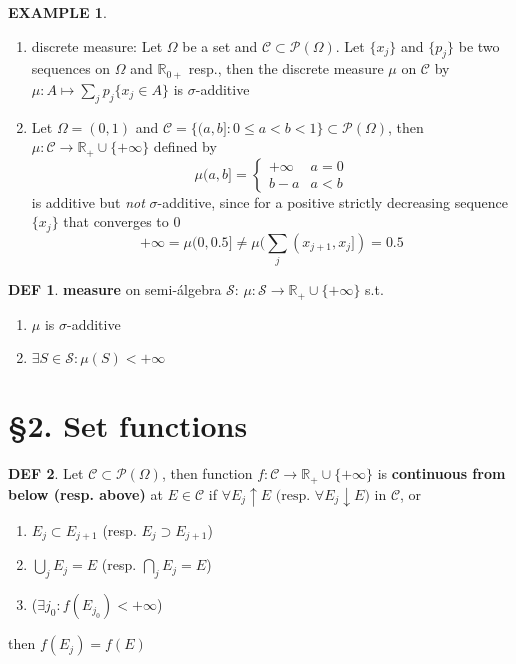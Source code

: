 \documentclass[hidelinks]{article}
\theoremstyle{definition}
\newtheorem*{defin}{DEF}
\newtheorem*{eg}{EXAMPLE}
\theoremstyle{dotless}
\theoremstyle{remark}
\begin{document}
\begin{eg}~
\begin{enumerate}[label=\arabic*\degree]
    \item discrete measure: Let $\Omega$ be a set and $\mathscr{C}\subset\mathscr{P}(\Omega)$. Let $\{x_j\}$ and $\{p_j\}$ be two sequences on $\Omega$ and $\mathbb{R}_{0+}$ resp., then the discrete measure $\mu$ on $\mathscr{C}$ by $\mu:A\mapsto\sum_jp_j\{x_j\in A\}$ is $\sigma$-additive
    \item Let $\Omega=(0,1)$ and $\mathscr{C}=\{(a,b]:0\leq a<b<1\}\subset\mathscr{P}(\Omega)$, then $\mu:\mathscr{C}\to\mathbb{R}_+\cup\{+\infty\}$ defined by
    \[\mu(a,b]=
    \begin{cases} 
      +\infty & a=0 \\
      b-a & a<b
   \end{cases}
\]
is additive but \emph{not} $\sigma$-additive, since for a positive strictly decreasing sequence $\{x_j\}$ that converges to 0
\[+\infty=\mu(0,0.5]\neq\mu(\sum_j(x_{j+1},x_j])=0.5\]
\end{enumerate}
\end{eg}

\begin{defin}
\textbf{measure} on semi-álgebra $\mathscr{S}$: $\mu:\mathscr{S}\to\mathbb{R}_+\cup\{+\infty\}$ s.t. \begin{enumerate}[label=\arabic*\degree]
    \item $\mu$ is $\sigma$-additive 
    \item $\exists S\in\mathscr{S}:\mu(S)<+\infty$
\end{enumerate}
\end{defin}

\section*{\S2. Set functions}
\setcounter{section}{2}

\begin{defin}
Let $\mathscr{C}\subset\mathscr{P}(\Omega)$, then function $f:\mathscr{C}\to\mathbb{R}_+\cup\{+\infty\}$ is \textbf{continuous from below (resp. above)} at $E\in\mathscr{C}$ if $\forall E_j\uparrow E\textrm{ (resp. }\forall E_j\downarrow E)$ in $\mathscr{C}$, or
\begin{enumerate}[label=\arabic*\degree]
    \item $E_j\subset E_{j+1}$ (resp. $E_j\supset E_{j+1}$)
    \item $\bigcup\limits_jE_j=E$ (resp. $\bigcap\limits_jE_j=E$)
    \item ($\exists j_0:f(E_{j_0})<+\infty$)
\end{enumerate}
then $f(E_j)=f(E)$
\end{defin}
\end{document}
